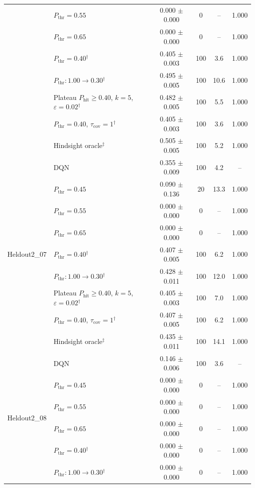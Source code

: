 \begin{table}[htbp]
\begin{tabular}{llcccc}
 & $P_{\mathrm{thr}}=0.55$ & 0.000 $\pm$ 0.000 & 0 & -- & 1.000 \\
 & $P_{\mathrm{thr}}=0.65$ & 0.000 $\pm$ 0.000 & 0 & -- & 1.000 \\
 & $P_{\mathrm{thr}}=0.40$$^{\dagger}$ & 0.405 $\pm$ 0.003 & 100 & 3.6 & 1.000 \\
 & $P_{\mathrm{thr}}: 1.00 \to 0.30$$^{\dagger}$ & 0.495 $\pm$ 0.005 & 100 & 10.6 & 1.000 \\
 & Plateau $P_{\mathrm{hit}}\geq0.40$, $k=5$, $\varepsilon=0.02$$^{\dagger}$ & 0.482 $\pm$ 0.005 & 100 & 5.5 & 1.000 \\
 & $P_{\mathrm{thr}}=0.40$, $\tau_{\mathrm{cov}}=1$$^{\dagger}$ & 0.405 $\pm$ 0.003 & 100 & 3.6 & 1.000 \\
 & Hindsight oracle$^{\ddagger}$ & 0.505 $\pm$ 0.005 & 100 & 5.2 & 1.000 \\
\midrule
\multirow{9}{*}{Heldout2\_07} & DQN & 0.355 $\pm$ 0.009 & 100 & 4.2 & -- \\
 & $P_{\mathrm{thr}}=0.45$ & 0.090 $\pm$ 0.136 & 20 & 13.3 & 1.000 \\
 & $P_{\mathrm{thr}}=0.55$ & 0.000 $\pm$ 0.000 & 0 & -- & 1.000 \\
 & $P_{\mathrm{thr}}=0.65$ & 0.000 $\pm$ 0.000 & 0 & -- & 1.000 \\
 & $P_{\mathrm{thr}}=0.40$$^{\dagger}$ & 0.407 $\pm$ 0.005 & 100 & 6.2 & 1.000 \\
 & $P_{\mathrm{thr}}: 1.00 \to 0.30$$^{\dagger}$ & 0.428 $\pm$ 0.011 & 100 & 12.0 & 1.000 \\
 & Plateau $P_{\mathrm{hit}}\geq0.40$, $k=5$, $\varepsilon=0.02$$^{\dagger}$ & 0.405 $\pm$ 0.003 & 100 & 7.0 & 1.000 \\
 & $P_{\mathrm{thr}}=0.40$, $\tau_{\mathrm{cov}}=1$$^{\dagger}$ & 0.407 $\pm$ 0.005 & 100 & 6.2 & 1.000 \\
 & Hindsight oracle$^{\ddagger}$ & 0.435 $\pm$ 0.011 & 100 & 14.1 & 1.000 \\
\midrule
\multirow{9}{*}{Heldout2\_08} & DQN & 0.146 $\pm$ 0.006 & 100 & 3.6 & -- \\
 & $P_{\mathrm{thr}}=0.45$ & 0.000 $\pm$ 0.000 & 0 & -- & 1.000 \\
 & $P_{\mathrm{thr}}=0.55$ & 0.000 $\pm$ 0.000 & 0 & -- & 1.000 \\
 & $P_{\mathrm{thr}}=0.65$ & 0.000 $\pm$ 0.000 & 0 & -- & 1.000 \\
 & $P_{\mathrm{thr}}=0.40$$^{\dagger}$ & 0.000 $\pm$ 0.000 & 0 & -- & 1.000 \\
 & $P_{\mathrm{thr}}: 1.00 \to 0.30$$^{\dagger}$ & 0.000 $\pm$ 0.000 & 0 & -- & 1.000 \\

\end{tabular}
\end{table}
